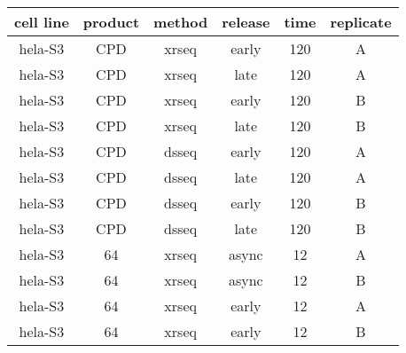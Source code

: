 \begin{table}[H]
    \centering
    \begin{adjustbox}{max width=\textwidth}
    \begin{tabular}{cccccc}
    \hline
    \multicolumn{1}{|c|}{\textbf{cell line}} & \multicolumn{1}{c|}{\textbf{product}} & \multicolumn{1}{c|}{\textbf{method}} & \multicolumn{1}{c|}{\textbf{release}} & \multicolumn{1}{c|}{\textbf{time}} & \multicolumn{1}{c|}{\textbf{replicate}} \\ \hline
    \gls{hela}-S3           & \gls{CPD}              & \gls{xrseq}         & early            & 120           & A                  \\ \hline 
    \gls{hela}-S3           & \gls{CPD}              & \gls{xrseq}         & late             & 120           & A                  \\ \hline 
    \gls{hela}-S3           & \gls{CPD}              & \gls{xrseq}         & early            & 120           & B                  \\ \hline 
    \gls{hela}-S3           & \gls{CPD}              & \gls{xrseq}         & late             & 120           & B                  \\ \hline 
    \gls{hela}-S3           & \gls{CPD}              & \gls{dsseq}     & early            & 120           & A                  \\ \hline 
    \gls{hela}-S3           & \gls{CPD}              & \gls{dsseq}     & late             & 120           & A                  \\ \hline 
    \gls{hela}-S3           & \gls{CPD}              & \gls{dsseq}     & early            & 120           & B                  \\ \hline 
    \gls{hela}-S3           & \gls{CPD}              & \gls{dsseq}     & late             & 120           & B                  \\ \hline 
    \gls{hela}-S3           & \gls{64}           & \gls{xrseq}         & async            & 12            & A                  \\ \hline 
    \gls{hela}-S3           & \gls{64}           & \gls{xrseq}         & async            & 12            & B                  \\ \hline 
    \gls{hela}-S3           & \gls{64}           & \gls{xrseq}         & early            & 12            & A                  \\ \hline 
    \gls{hela}-S3           & \gls{64}           & \gls{xrseq}         & early            & 12            & B                  \\ \hline 

\end{tabular}
\end{adjustbox}
\end{table}
